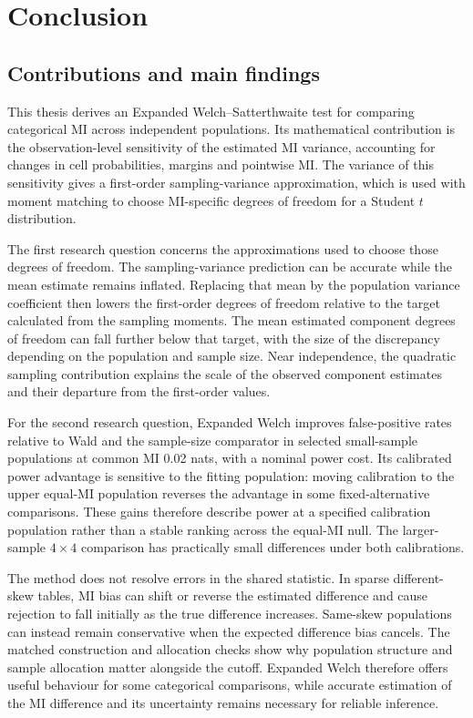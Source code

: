 \chapter{Conclusion}
\label{chap:conclusion}

\section{Contributions and main findings}

This thesis derives an Expanded Welch--Satterthwaite test for comparing
categorical MI across independent populations. Its mathematical
contribution is the observation-level sensitivity of the estimated MI
variance, accounting for changes in cell probabilities, margins and
pointwise MI. The variance of this sensitivity gives a first-order
sampling-variance approximation, which is used with moment matching to
choose MI-specific degrees of freedom for a Student \(t\) distribution.

The first research question concerns the approximations used to choose
those degrees of freedom. The sampling-variance prediction can be accurate
while the mean estimate remains inflated. Replacing that mean by the
population variance coefficient then lowers the first-order degrees of
freedom relative to the target calculated from the sampling moments.
The mean estimated component degrees of freedom can fall further below
that target, with the size of the discrepancy depending on the population
and sample size. Near independence, the quadratic sampling contribution
explains the scale of the observed component estimates and their departure
from the first-order values.

For the second research question, Expanded Welch improves false-positive
rates relative to Wald and the sample-size comparator in selected
small-sample populations at common MI 0.02 nats, with a nominal power
cost. Its calibrated power advantage is sensitive to the fitting
population: moving calibration to the upper equal-MI population reverses
the advantage in some fixed-alternative comparisons. These gains
therefore describe power at a specified calibration population rather
than a stable ranking across the equal-MI null. The larger-sample
\(4\times4\) comparison has practically small differences under both
calibrations.

The method does not resolve errors in the shared statistic. In sparse
different-skew tables, MI bias can shift or reverse the estimated
difference and cause rejection to fall initially as the true difference
increases. Same-skew populations can instead remain conservative when
the expected difference bias cancels. The matched construction and
allocation checks show why population structure and sample allocation
matter alongside the cutoff. Expanded Welch therefore offers useful
behaviour for some categorical comparisons, while accurate estimation
of the MI difference and its uncertainty remains necessary for reliable
inference.

